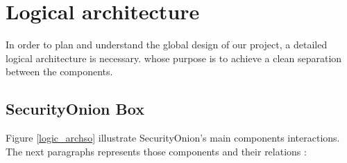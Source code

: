 \section{Logical architecture}

In order to plan and understand the global design of our project, a detailed logical architecture is necessary. whose purpose is to achieve a clean separation between the components.

\subsection{SecurityOnion Box}

Figure \ref{logic_archso} illustrate SecurityOnion's main components interactions. The next paragraphs represents those components and their relations :

